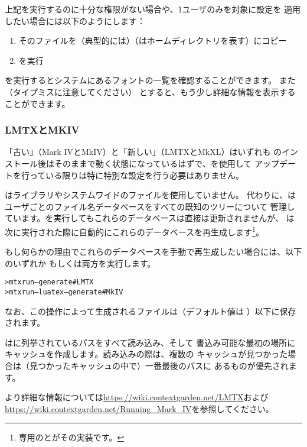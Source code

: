 \documentclass[uplatex,dvipdfmx,12pt,tombow]{jsarticle}
\begin{document}
上記を実行するのに十分な権限がない場合や、1ユーザのみを対象に設定を
適用したい場合には以下のようにします：
%
\begin{enumerate}
\item そのファイルを（典型的には）（\dir{~}はホームディレクトリを表す）にコピー
\item {}を実行
\end{enumerate}

を実行するとシステムにあるフォントの一覧を確認することができます。
また（タイプミスに注意してください）
とすると、もう少し詳細な情報を表示することができます。

\subsubsection{{\ConTeXt} LMTXとMKIV}
\label{sec:context}

「古い」\ConTeXt （Mark IVとMkIV）と「新しい」\ConTeXt （LMTXとMkXL）はいずれも
\TL のインストール後はそのままで動く状態になっているはずで、を使用して
アップデートを行っている限りは特に特別な設定を行う必要はありません。

\ConTeXt は\KPS ライブラリやシステムワイドのファイルを使用していません。
代わりに、\ConTeXt はユーザごとのファイル名データベースをすべての既知のツリーについて
管理しています。を実行してもこれらのデータベースは直接は更新されませんが、
\ConTeXt は次に実行された際に自動的にこれらのデータベースを再生成します\footnote{\TL
専用のとがその実装です。}。

もし何らかの理由でこれらのデータベースを手動で再生成したい場合には、以下のいずれか
もしくは両方を実行します。
%
\begin{alltt}
> mtxrun --generate           # LMTX
> mtxrun --luatex --generate  # MkIV
\end{alltt}

なお、この操作によって生成されるファイルは（デフォルト値は
）以下に保存されます。

\ConTeXt はに列挙されているパスをすべて読み込み、そして
書込み可能な最初の場所にキャッシュを作成します。読み込みの際は、複数の
キャッシュが見つかった場合は（見つかったキャッシュの中で）一番最後のパスに
あるものが優先されます。

より詳細な情報については\url{https://wiki.contextgarden.net/LMTX}および
\url{https://wiki.contextgarden.net/Running_Mark_IV}を参照してください。
\end{document}
